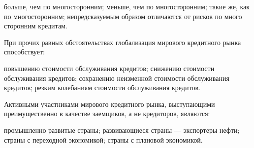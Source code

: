 \documentclass[12pt, table]{exam}
\begin{document}
\begin{questions}
\begin{multicols}{2}
\begin{choices}
	 \choice больше, чем по многосторонним;
	 \choice меньше, чем по многосторонним;
	 \CC такие же, как по многосторонним;
	 \choice непредсказуемым образом отличаются от рисков по много сторонним кредитам.
	 \end{choices}
\question При прочих равных обстоятельствах глобализация мирового кредитного рынка способствует:
	 \begin{choices}
	 \choice повышению стоимости обслуживания кредитов;
	 \choice снижению стоимости обслуживания кредитов;
	 \CC сохранению неизменной стоимости обслуживания кредитов;
	 \choice резким колебаниям стоимости обслуживания кредитов.
	 \end{choices}
\question Активными участниками мирового кредитного рынка, выступающими преимущественно в качестве заемщиков, а не кредиторов, являются:
	 \begin{choices}
	 \CC промышленно развитые страны;
	 \choice развивающиеся страны — экспортеры нефти;
	 \choice страны с переходной экономикой;
	 \choice страны с плановой экономикой.
	 \end{choices}



\end{multicols}
\end{questions}
\end{document}
